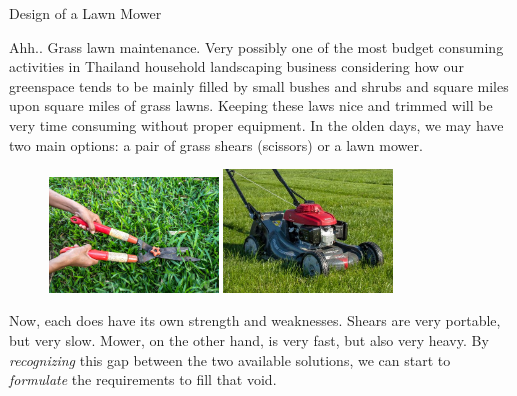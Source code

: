 \documentclass[
10pt,
a4paper,
openany,
svgnames,
]{book}
\begin{document}
\begin{example} Design of a Lawn Mower

  Ahh.. Grass lawn maintenance. Very possibly one of the most budget consuming activities in Thailand household landscaping business considering how our greenspace tends to be mainly filled by small bushes and shrubs and square miles upon square miles of grass lawns. Keeping these laws nice and trimmed will be very time consuming without proper equipment. In the olden days, we may have two main options: a pair of grass shears (scissors) or a lawn mower.

  \begin{figure}[H]
    \centering
    \includegraphics[width=0.4\textwidth]{pictures/intro-eng-design/grass-shears}
    \hspace{1cm}
    \includegraphics[width=0.4\textwidth]{pictures/intro-eng-design/lawn-mower}
  \end{figure}
  
  Now, each does have its own strength and weaknesses. Shears are very portable, but very slow. Mower, on the other hand, is very fast, but also very heavy. By \emph{recognizing} this gap between the two available solutions, we can start to \emph{formulate} the requirements to fill that void.
  
  \begin{figure}[H]
    \centering
  \end{figure}


\end{example}
\end{document}
